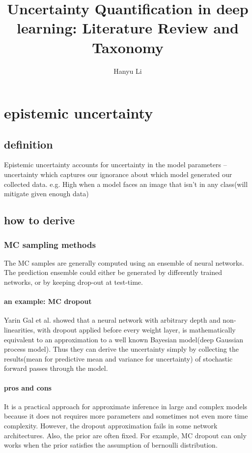\documentclass{ctexart}
\title{Uncertainty Quantification in deep learning: Literature Review and Taxonomy}
\author{Hanyu Li}
\begin{document}
\maketitle
\section{epistemic uncertainty}

\subsection{definition}
Epistemic uncertainty accounts for uncertainty in the model parameters – uncertainty which captures our ignorance about which model generated our collected data. \cite{DBLP:journals/corr/KendallG17}e.g. High when a model faces an image that isn't in any class(will mitigate given enough data)

\subsection{how to derive}
\subsubsection{MC sampling methods}
The MC samples are generally computed using an ensemble of neural networks. The prediction ensemble could either be generated by differently trained networks, or by keeping drop-out at test-time\cite{DBLP:journals/corr/abs-1907-06890}.
\paragraph{an example: MC dropout}
Yarin Gal et al. showed that a neural network with arbitrary depth and non-linearities, with dropout applied before every weight layer, is mathematically equivalent to an approximation to a well known Bayesian model(deep Gaussian process model)\cite{gal2015dropout}. Thus they can derive the uncertainty simply by collecting the results(mean for predictive mean and variance for uncertainty) of stochastic forward passes through the model.
\paragraph{pros and cons}
It is a practical approach for approximate inference in large and complex models because it does not requires more parameters and sometimes not even more time complexity. However, the dropout approximation fails in some network architectures\cite{gal2015bayesian}. Also, the prior are often fixed. For example, MC dropout can only works when the prior satisfies the assumption of bernoulli distribution.
\end{document}
